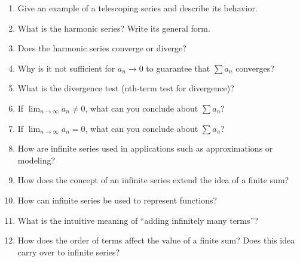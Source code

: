 \begin{enumerate}
  \item Give an example of a telescoping series and describe its behavior.
  \item What is the harmonic series? Write its general form.
  \item Does the harmonic series converge or diverge?
  \item Why is it not sufficient for \(a_{n} \to 0\) to guarantee that \(\sum a_{n}\) converges?
  \item What is the divergence test (nth-term test for divergence)?
  \item If \(\lim_{n \to \infty}a_{n} \neq 0\), what can you conclude about \(\sum a_{n}\)?
  \item If \(\lim_{n \to \infty}a_{n} = 0\), what can you conclude about \(\sum a_{n}\)?
  \item How are infinite series used in applications such as approximations or modeling?
  \item How does the concept of an infinite series extend the idea of a finite sum?
  \item How can infinite series be used to represent functions?
  \item What is the intuitive meaning of “adding infinitely many terms”?
  \item How does the order of terms affect the value of a finite sum? Does this idea carry over to infinite series?
\end{enumerate}
